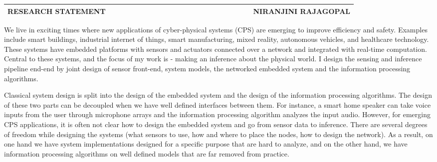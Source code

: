 \documentclass[10pt]{article}
\date{}
\begin{document}

\begin{table}
\color{blue}
\begin{tabular*}{\textwidth}{l r}
\large\textbf{RESEARCH STATEMENT} & 
\hfill \ \ \ \ \ \ \ \ \ \ \ \ \ \ \ \ \ \ \ \
\ \ \ \ \ \ \ \ \ \ \ \ \ \ \ 
\large\textbf{NIRANJINI RAJAGOPAL}\\
\hline
\end{tabular*}

\end{table}


We live in exciting times where new applications of cyber-physical systems
(CPS) are emerging to improve efficiency and safety. Examples include smart buildings, industrial internet of things, smart manufacturing, mixed reality, autonomous vehicles, and healthcare technology. These systems have embedded platforms with sensors and actuators connected over a network and integrated with real-time computation. Central to these systems, and the focus of my work is - making an inference about the physical world. I design the sensing and inference pipeline end-end by joint design of sensor front-end, system models, the networked embedded system and the information processing algorithms. 


Classical system design is split into the design of the embedded system and the design of the information processing algorithms. 
The design of these two parts can be decoupled when we have well defined interfaces between them. For instance, a smart home speaker can take voice inputs from the user through microphone arrays and the information processing algorithm analyzes the input audio.  However, for emerging CPS applications, it is often not clear how to design the embedded system and go from sensor data to inference. There are several degrees of freedom while designing the systems (what sensors to use, how and where to place the nodes, how to design the network). 
As a result, on one hand we have system implementations designed for a specific purpose that are hard to analyze, and on the other hand, we have information processing algorithms on well defined models that are far removed from practice.\\
\end{document}
